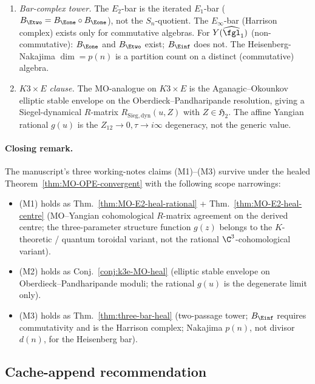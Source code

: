 \begin{theorem}
\begin{enumerate}[label=\textup{(\roman*)}]
\item \emph{Bar-complex tower.}  The $E_2$-bar is the iterated
$E_1$-bar ($B_{\Etwo} = B_{\Eone}\circ B_{\Eone}$), not the
$S_n$-quotient.  The $E_\infty$-bar (Harrison complex) exists only
for commutative algebras.  For $Y(\widehat{\fgl}_1)$ (non-commutative):
$B_{\Eone}$ and $B_{\Etwo}$ exist; $B_{\Einf}$ does not.  The
Heisenberg-Nakajima $\dim = p(n)$ is a partition count on a
distinct (commutative) algebra.
\item \emph{$K3\times E$ clause.}  The MO-analogue on $K3\times E$ is
the Aganagic--Okounkov elliptic stable envelope on the
Oberdieck--Pandharipande resolution, giving a Siegel-dynamical
$R$-matrix $R_{\mathrm{Sieg,dyn}}(u, Z)$ with
$Z\in\mathfrak H_2$.  The affine Yangian rational $g(u)$ is the
$Z_{12}\to 0, \tau\to i\infty$ degeneracy, not the generic value.
\end{enumerate}
\end{theorem}

\paragraph{Closing remark.}  The manuscript's three working-notes
claims (M1)--(M3) survive under the healed Theorem~\ref{thm:MO-OPE-convergent}
with the following scope narrowings:
\begin{itemize}
\item (M1) holds as Thm.~\ref{thm:MO-E2-heal-rational} + Thm.~\ref{thm:MO-E2-heal-centre}
(MO--Yangian cohomological $R$-matrix agreement on the
derived centre; the three-parameter structure function $g(z)$
belongs to the $K$-theoretic / quantum toroidal variant, not the
rational $\C^3$-cohomological variant).
\item (M2) holds as Conj.~\ref{conj:k3e-MO-heal} (elliptic stable
envelope on Oberdieck--Pandharipande moduli; the rational $g(u)$
is the degenerate limit only).
\item (M3) holds as Thm.~\ref{thm:three-bar-heal} (two-passage tower;
$B_{\Einf}$ requires commutativity and is the Harrison complex;
Nakajima $p(n)$, not divisor $d(n)$, for the Heisenberg bar).
\end{itemize}

\subsection*{Cache-append recommendation}

